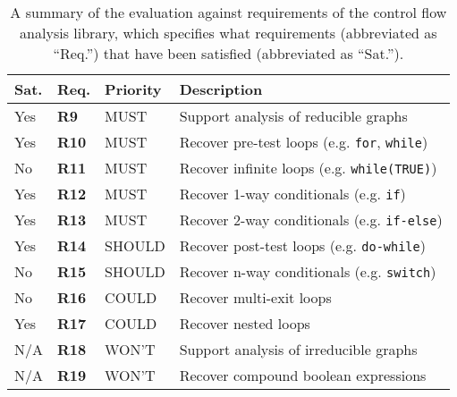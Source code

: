 \begin{table}[htbp]
	\begin{center}
		\begin{tabular}{|l|l|l|l|}
			\hline
			Sat. & Req. & Priority & Description \\
			\hline
			\rowcolor{light_green_3}
			Yes & \textbf{R9} & MUST & Support analysis of reducible graphs \\
			\rowcolor{light_green_3}
			Yes & \textbf{R10} & MUST & Recover pre-test loops (e.g. \texttt{for}, \texttt{while}) \\
			\rowcolor{light_red_3}
			No & \textbf{R11} & MUST & Recover infinite loops (e.g. \texttt{while(TRUE)}) \\
			\rowcolor{light_green_3}
			Yes & \textbf{R12} & MUST & Recover 1-way conditionals (e.g. \texttt{if}) \\
			\rowcolor{light_green_3}
			Yes & \textbf{R13} & MUST & Recover 2-way conditionals (e.g. \texttt{if-else}) \\
			\hline
			\rowcolor{light_green_3}
			Yes & \textbf{R14} & SHOULD & Recover post-test loops (e.g. \texttt{do-while}) \\
			\rowcolor{light_red_3}
			No & \textbf{R15} & SHOULD & Recover n-way conditionals (e.g. \texttt{switch}) \\
			\hline
			\rowcolor{light_red_3}
			No & \textbf{R16} & COULD & Recover multi-exit loops \\
			\rowcolor{light_green_3}
			Yes & \textbf{R17} & COULD & Recover nested loops \\
			\hline
			N/A & \textbf{R18} & WON'T & Support analysis of irreducible graphs \\
			N/A & \textbf{R19} & WON'T & Recover compound boolean expressions \\
			\hline
		\end{tabular}
	\end{center}
	\caption{A summary of the evaluation against requirements of the control flow analysis library, which specifies what requirements (abbreviated as ``Req.'') that have been satisfied (abbreviated as ``Sat.'').}
	\label{tbl:eval_summary_of_control_flow_analysis_library}
\end{table}





